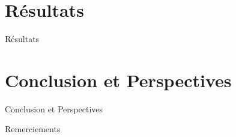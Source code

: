 \documentclass[aspectratio=169]{beamer}
\begin{document}
\section{Résultats}

\begin{frame}{Résultats}
    
\end{frame}


\section{Conclusion et Perspectives}

\begin{frame}{Conclusion et Perspectives}
    
\end{frame}


\begin{frame}{Remerciements}
    
\end{frame}
\end{document}
